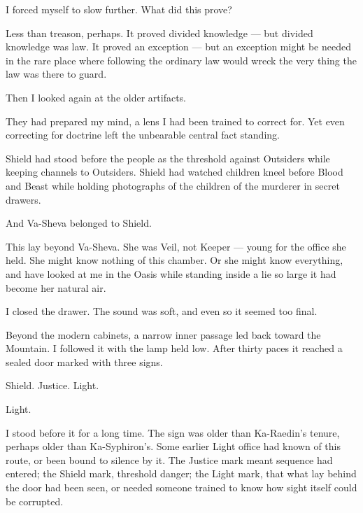 I forced myself to slow further. What did this prove?\par

Less than treason, perhaps. It proved divided knowledge --- but divided knowledge was law. It proved an exception --- but an exception might be needed in the rare place where following the ordinary law would wreck the very thing the law was there to guard.\par

Then I looked again at the older artifacts.\par

They had prepared my mind, a lens I had been trained to correct for. Yet even correcting for doctrine left the unbearable central fact standing.\par

Shield had stood before the people as the threshold against Outsiders while keeping channels to Outsiders. Shield had watched children kneel before Blood and Beast while holding photographs of the children of the murderer in secret drawers.\par

And Va-Sheva belonged to Shield.\par

This lay beyond Va-Sheva. She was Veil, not Keeper --- young for the office she held. She might know nothing of this chamber. Or she might know everything, and have looked at me in the Oasis while standing inside a lie so large it had become her natural air.\par

I closed the drawer. The sound was soft, and even so it seemed too final.\par

Beyond the modern cabinets, a narrow inner passage led back toward the Mountain. I followed it with the lamp held low. After thirty paces it reached a sealed door marked with three signs.\par

Shield. Justice. Light.\par

Light.\par

I stood before it for a long time. The sign was older than Ka-Raedin's tenure, perhaps older than Ka-Syphiron's. Some earlier Light office had known of this route, or been bound to silence by it. The Justice mark meant sequence had entered; the Shield mark, threshold danger; the Light mark, that what lay behind the door had been seen, or needed someone trained to know how sight itself could be corrupted.\par

